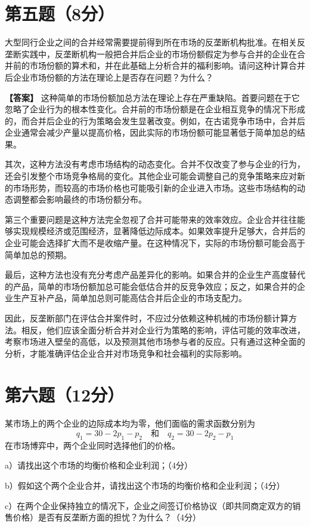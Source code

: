 \documentclass[12pt]{article}
\begin{document}
\section*{第五题（8分）}
大型同行企业之间的合并经常需要提前得到所在市场的反垄断机构批准。在相关反垄断实践中，反垄断机构一般把合并后企业的市场份额假定为参与合并的企业在合并前的市场份额的算术和，并在此基础上分析合并的福利影响。请问这种计算合并后企业市场份额的方法在理论上是否存在问题？为什么？

\noindent\textbf{【答案】}
这种简单的市场份额加总方法在理论上存在严重缺陷。首要问题在于它忽略了企业行为的根本性变化。合并前的市场份额是在企业相互竞争的情况下形成的，而合并后企业的行为策略会发生显著改变。例如，在古诺竞争市场中，合并后企业通常会减少产量以提高价格，因此实际的市场份额可能显著低于简单加总的结果。

其次，这种方法没有考虑市场结构的动态变化。合并不仅改变了参与企业的行为，还会引发整个市场竞争格局的变化。其他企业可能会调整自己的竞争策略来应对新的市场形势，而较高的市场价格也可能吸引新的企业进入市场。这些市场结构的动态调整都会影响最终的市场份额分布。

第三个重要问题是这种方法完全忽视了合并可能带来的效率效应。企业合并往往能够实现规模经济或范围经济，显著降低边际成本。如果效率提升足够大，合并后的企业可能会选择扩大而不是收缩产量。在这种情况下，实际的市场份额可能会高于简单加总的预期。

最后，这种方法也没有充分考虑产品差异化的影响。如果合并的企业生产高度替代的产品，简单的市场份额加总可能会低估合并的反竞争效应；反之，如果合并的企业生产互补产品，简单加总则可能高估合并后企业的市场支配力。

因此，反垄断部门在评估合并案件时，不应过分依赖这种机械的市场份额计算方法。相反，他们应该全面分析合并对企业行为策略的影响，评估可能的效率改进，考察市场进入壁垒的高低，以及预测其他市场参与者的反应。只有通过这种全面的分析，才能准确评估企业合并对市场竞争和社会福利的实际影响。

\section*{第六题（12分）}
某市场上的两个企业的边际成本均为零，他们面临的需求函数分别为
\[q_1=30-2p_1-p_2\quad\text{和}\quad q_2=30-2p_2-p_1\]
在市场博弈中，两个企业同时选择他们的价格。

a）请找出这个市场的均衡价格和企业利润；（4分）

b）假如这个两个企业合并，请找出这个市场的均衡价格和企业利润；（4分）

c）在两个企业保持独立的情况下，企业之间签订价格协议（即共同商定双方的销售价格）是否有反垄断方面的担忧？为什么？（4分）
\end{document}
